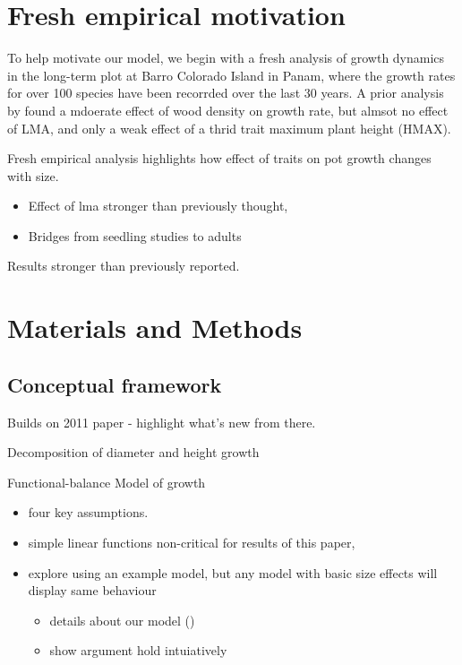 \documentclass[12pt, a4paper]{article}
\begin{document}
\section*{Fresh empirical motivation}\label{fresh-empirical-motivation}

To help motivate our model, we begin with a fresh analysis of growth dynamics
in the long-term plot at Barro Colorado Island in Panam, where the growth
rates for over 100 species have been recorrded over the last 30 years. A
prior analysis by \citet{wright_functional_2010} found a mdoerate effect of
wood density on growth rate, but almsot no effect of LMA, and only a weak
effect of a thrid trait maximum plant height (HMAX).


Fresh empirical analysis highlights how effect of traits on pot growth
changes with size.

\begin{itemize}
\itemsep1pt\parskip0pt
\item
  Effect of lma stronger than previously thought,
\item
  Bridges from seedling studies to adults
\end{itemize}

Results stronger than previously reported.

\section*{Materials and Methods}\label{materials-and-methods}

\subsection*{Conceptual framework}\label{conceptual-framework}

Builds on 2011 paper - highlight what's new from there.

Decomposition of diameter and height growth

Functional-balance Model of growth

\begin{itemize}
\itemsep1pt\parskip0pt
\item
  four key assumptions.
\item
  simple linear functions non-critical for results of this paper,
\item
  explore using an example model, but any model with basic size effects
  will display same behaviour

  \begin{itemize}
  \itemsep1pt\parskip0pt
  \item
    details about our model ()
  \item
    show argument hold intuiatively
  \end{itemize}
\end{itemize}
\end{document}
